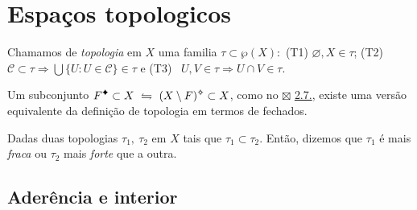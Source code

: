 \section{Espaços topologicos}

\begin{definition}
    Chamamos de \emph{topologia} em \(X\) uma familia \(\tau \subset \wp(X) :\) (T1) \(\varnothing, X \in \tau\); (T2) \(\mathcal{C} \subset \tau \Rightarrow  \bigcup \{U : U \in \mathcal{C}\} \in \tau\) e (T3) \ \( U,  V \in \tau\Rightarrow  U\cap V \in \tau \). 
\end{definition}

\begin{note}
    Um subconjunto \(F\ce\subset X \ \leftrightharpoons \ (X \setminus F)\ab \subset X\), como no {\scriptsize \(\boxtimes\)} \hyperlink{coro27}{2.7.}, existe uma versão equivalente da definição de  topologia em termos de fechados.
\end{note}

\begin{definition}
    Dadas duas topologias \(\tau_1, \ \tau_2 \) em \(X\) tais que \(\tau_1\subset \tau_2\). Então, dizemos que \(\tau_1\) é mais \emph{fraca} ou \(\tau_2\) mais \emph{forte}  que a outra.  
\end{definition}


\subsection*{Aderência e interior}

